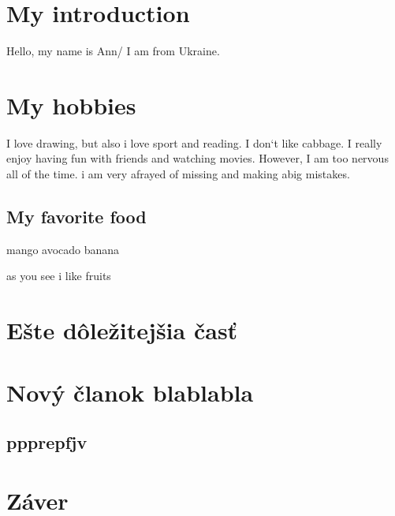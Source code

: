 \documentclass[10pt,twoside,english,a4paper]{article}
\begin{document}
\section*{My introduction}
Hello, my name is Ann/ I am from Ukraine.
\section*{My hobbies}




I love drawing, but also i love sport and reading.
I don`t like cabbage. I  really enjoy having fun with friends and watching movies. However, I am too nervous all of the time. i am very afrayed of missing and making  abig mistakes.
\subsection{My favorite food}
mango
avocado
banana

as you see i like fruits
\section{Ešte dôležitejšia časť} \label{dolezitejsia}


\section{Nový članok blablabla}
\subsection{ppprepfjv}



\section{Záver} \label{zaver} %






\end{document}
